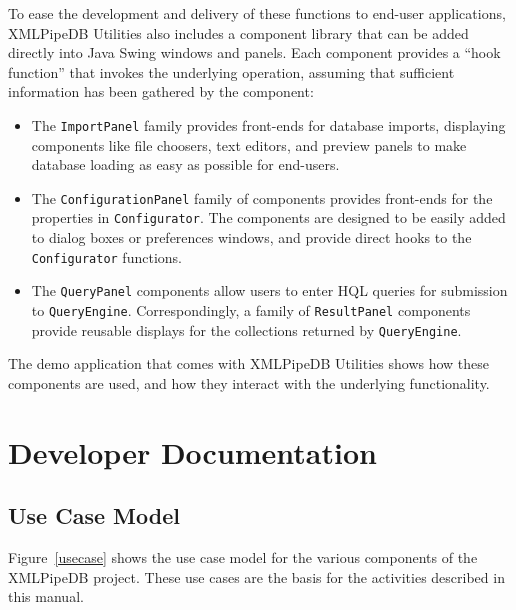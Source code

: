 \documentclass[11pt]{article}
\begin{document}
To ease the development and delivery of these functions to end-user applications, XMLPipeDB Utilities also includes a component library that can be added directly into Java Swing windows and panels.  Each component provides a ``hook function'' that invokes the underlying operation, assuming that sufficient information has been gathered by the component:
\begin{itemize}
\item The \texttt{ImportPanel} family provides front-ends for database imports, displaying components like file choosers, text editors, and preview panels to make database loading as easy as possible for end-users.

\item The \texttt{ConfigurationPanel} family of components provides front-ends for the properties in \texttt{Configurator}.  The components are designed to be easily added to dialog boxes or preferences windows, and provide direct hooks to the \texttt{Configurator} functions.

\item The \texttt{QueryPanel} components allow users to enter HQL queries for submission to \texttt{QueryEngine}.  Correspondingly, a family of \texttt{ResultPanel} components provide reusable displays for the collections returned by \texttt{QueryEngine}.
\end{itemize}
The demo application that comes with XMLPipeDB Utilities shows how these components are used, and how they interact with the underlying functionality.

\section{Developer Documentation}
\label{dev}

\subsection{Use Case Model}

Figure~\ref{usecase} shows the use case model for the various components of the XMLPipeDB project.  These use cases are the basis for the activities described in this manual.
\end{document}
